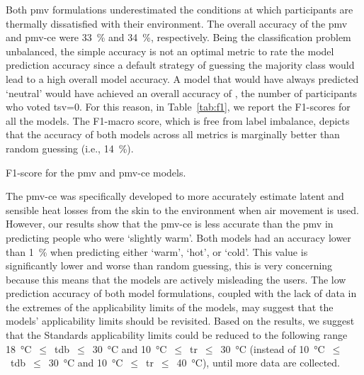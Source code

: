 Both \ac{pmv} formulations underestimated the conditions at which participants are thermally dissatisfied with their environment.
The overall accuracy of the \ac{pmv} and \ac{pmv-ce} were \qty{33}{\percent} and \qty{34}{\percent}, respectively.
Being the classification problem unbalanced, the simple accuracy is not an optimal metric to rate the model prediction accuracy since a default strategy of guessing the majority class would lead to a high overall model accuracy.
A model that would have always predicted `neutral' would have achieved an overall accuracy of , the number of participants who voted \ac{tsv}=0.
For this reason, in Table~\ref{tab:f1}, we report the F1-scores for all the models.
The F1-macro score, which is free from label imbalance, depicts that the accuracy of both models across all metrics is marginally better than random guessing (i.e., \qty{14}{\percent}).
\begin{table}[htb!]
    \centering
    
    \caption{F1-score for the \ac{pmv} and \ac{pmv-ce} models.}
    \label{tab:f1}
\end{table}

The \ac{pmv-ce} was specifically developed to more accurately estimate latent and sensible heat losses from the skin to the environment when air movement is used.
However, our results show that the \ac{pmv-ce} is less accurate than the \ac{pmv} in predicting people who were `slightly warm'.
Both models had an accuracy lower than \qty{1}{\percent} when predicting either `warm', `hot', or `cold'.
This value is significantly lower and worse than random guessing, this is very concerning because this means that the models are actively misleading the users.
The low prediction accuracy of both model formulations, coupled with the lack of data in the extremes of the applicability limits of the models, may suggest that the models' applicability limits should be revisited.
Based on the results, we suggest that the Standards applicability limits could be reduced to the following range \qty{18}{\celsius}~$\leq$~\ac{tdb}~$\leq$~\qty{30}{\celsius} and \qty{10}{\celsius}~$\leq$~\ac{tr}~$\leq$~\qty{30}{\celsius} (instead of \qty{10}{\celsius}~$\leq$~\ac{tdb}~$\leq$~\qty{30}{\celsius} and \qty{10}{\celsius}~$\leq$~\ac{tr}~$\leq$~\qty{40}{\celsius}),  until more data are collected. 

